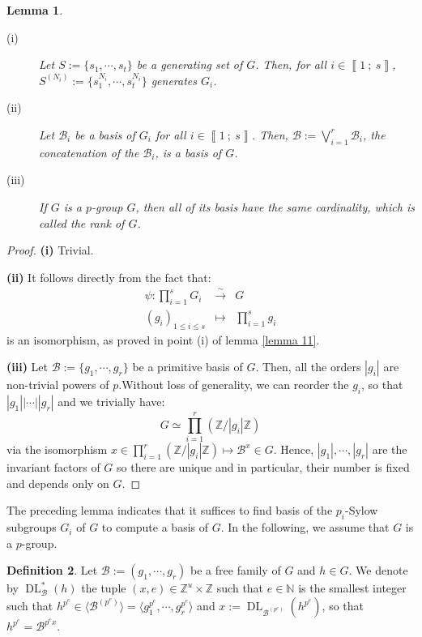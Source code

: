 \documentclass[a4paper,10pt]{report}
\theoremstyle{definition}
\newtheorem{definition}{Definition}[chapter]
\theoremstyle{plain}
\newtheorem{lemma}[definition]{Lemma}
\theoremstyle{definition}
\newcommand{\N}{\mathbb{N}}
\newcommand{\Z}{\mathbb{Z}}
\newcommand{\m}[1]{\mathcal{#1}}
\renewcommand{\i}[2]{\left\llbracket #1~;~#2\right\rrbracket}
\renewcommand{\(}{\left(}
\renewcommand{\)}{\right)}
\DeclareMathOperator{\DL}{DL}
\begin{document}
\begin{lemma}\label{lemma 12}
\begin{description}
\item[(i)] Let $S:=\{s_1,\cdots, s_t\}$ be a generating set of $G$.  Then, for all $i\in\i{1}{s}$, $S^{(N_i)}:=\{s_1^{N_i},\cdots, s_t^{N_i}\}$ generates $G_i$.

\item[(ii)] Let $\m{B}_i$ be a basis of $G_i$ for all $i\in\i{1}{s}$. Then, $\m{B}:=\bigvee_{i=1}^r\m{B}_i$, the concatenation of the $\m{B}_i$, is a basis of $G$.

\item[(iii)] If $G$ is a $p$-group $G$, then all of its basis have the same cardinality, which is called the \emph{rank} of $G$.
\end{description}
\end{lemma}

\begin{proof}
\textbf{(i)} Trivial.

\textbf{(ii)} It follows directly from the fact that:
\[\begin{array}{rcl}
\psi : \prod_{i=1}^s G_i &\overset{\sim}{\longrightarrow}& G\\
(g_i)_{1\leq i\leq s} &\longmapsto & \prod_{i=1}^s g_i
\end{array}\]
is an isomorphism, as proved in point (i) of lemma \ref{lemma 11}.

\textbf{(iii)} Let $\m{B}:=\{g_1,\cdots, g_r\}$ be a primitive basis of $G$. Then, all the orders $|g_i|$ are non-trivial powers of $p$.Without loss of generality, we can reorder the $g_i$, so that $|g_1||\cdots||g_r|$ and we trivially have:
\[G\simeq \prod_{i=1}^r (\Z/|g_i|\Z)\]
via the isomorphism $x\in\prod_{i=1}^r (\Z/|g_i|\Z)\longmapsto\m{B}^x\in G$.  Hence, $|g_1|,\cdots,|g_r|$ are the invariant factors of $G$ so there are unique and in particular, their number is fixed and depends only on $G$.
\end{proof}

The preceding lemma indicates that it suffices to find basis of the $p_i$-Sylow subgroups $G_i$ of $G$ to compute a basis of $G$. In the following, we assume that $G$ is a $p$-group.

\begin{definition}
Let $\m{B}:=(g_1,\cdots, g_r)$ be a free family of $G$ and $h\in G$. We denote by $\DL_{\m{B}}^*(h)$ the tuple $(x,e)\in\Z^u\times\Z$ such that $e\in\N$ is the smallest integer such that $h^{p^e}\in\langle\m{B}^{(p^e)}\rangle=\langle g_1^{p^e},\cdots, g_r^{p^e}\rangle$ and $x:=\DL_{\m{B}^{(p^e)}}(h^{p^e})$, so that $h^{p^e}=\m{B}^{p^e x}$. 
\end{definition}
\end{document}

